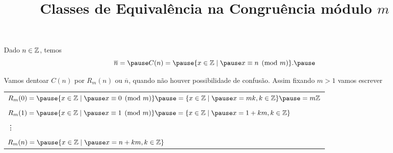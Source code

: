 \documentclass{beamer}
\title{Classes de Equival\^encia na Congruência módulo $m$}
\author[\autor]{\autor}
\institute[\instituto]{\instituto}
\date{}
\begin{document}
    \begin{frame}
        \maketitle
    \end{frame}


    \begin{frame}
        Dado $n \in \mathbb{Z}$, temos\pause
        \[
            \overline{n} = \pause C(n) = \pause \{x \in \z \mid \pause x\equiv n \pmod{m}\}.\pause
        \]

        Vamos dentoar $C(n)$ \pause por $R_{m}(n)$ \pause ou $\overline{n}$, \pause quando n{\~a}o houver possibilidade de confus{\~a}o. \pause Assim fixando $m > 1$ vamos escrever\pause
        \begin{center}
            \begin{tabular}{l}
                $R_{m}(0) = \pause \{x \in \z \mid \pause x\equiv 0 \pmod{m}\} \pause =\{x \in \z \mid \pause x = mk, k \in \z\}\pause = m\z$\pause\\
                \\
                $R_{m}(1) = \pause \{x \in \z \mid \pause x\equiv 1 \pmod{m}\} \pause = \{x \in \z \mid \pause x = 1 + km, k \in \z \}$\pause \\
                \\
                \vdots\\
                \\
                $R_{m}(n) = \pause \{x \in \z \mid \pause x = n + km, k \in \z \}$\pause    
            \end{tabular}
            
        \end{center}
    \end{frame}
\end{document}
